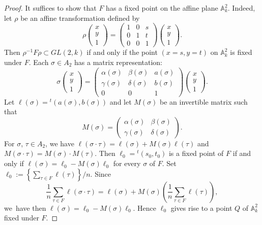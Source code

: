 \begin{proof}
It suffices to show that $F$ has a fixed point on the affine plane
$\mathbb{A}^{2}_{k}$. Indeed, let $\rho$ be an affine transformation
defined by 
$$
\rho
\begin{pmatrix}
x\\
y\\
1
\end{pmatrix}
=
\begin{pmatrix}
1 & 0 & s\\
0 & 1 & t\\
0 & 0 & 1
\end{pmatrix}
\begin{pmatrix}
x\\
y\\
1
\end{pmatrix}.
$$
Then $\rho^{-1}F\rho\subset GL(2,k)$ if and only if the point
$(x=s, y=t)$ on $\mathbb{A}^{2}_{k}$ is fixed under $F$. Each
$\sigma\in A_{2}$ has a matrix representation:
$$
\sigma
\begin{pmatrix}
x\\
y\\
1
\end{pmatrix}
=
\begin{pmatrix}
\alpha(\sigma) & \beta(\sigma) & a(\sigma)\\
\gamma(\sigma) & \delta(\sigma) & b(\sigma)\\
0 & 0 & 1
\end{pmatrix}
\begin{pmatrix}
x\\
y\\
1
\end{pmatrix}.
$$
Let $\ell(\sigma)={}^{t}(a(\sigma),b(\sigma))$ and let $M(\sigma)$ be
an invertible matrix such that
$$
M(\sigma)=
\begin{pmatrix}
\alpha(\sigma) & \beta(\sigma)\\
\gamma(\sigma) & \delta(\sigma)
\end{pmatrix}.
$$
For $\sigma$, $\tau\in A_{2}$, we have $\ell(\sigma\cdot
\tau)=\ell(\sigma)+M(\sigma)\ell(\tau)$ and
$M(\sigma\cdot\tau)=M(\sigma)\cdot M(\tau)$. Then
$\ell_{0}={}^{t}(s_{0},t_{0})$ is a fixed point of $F$ if and only if
$\ell(\sigma)=\ell_{0}-M(\sigma)\ell_{0}$ for every $\sigma$ of
$F$. Set $\ell_{0}:=\left\{{\displaystyle{\mathop{\sum}_{\tau\in
      F}}}\ell(\tau)\right\}/n$. Since
$$
\frac{1}{n}\sum_{\tau\in F}\ell(\sigma\cdot
\tau)=\ell(\sigma)+M(\sigma)\left(\frac{1}{n}\sum_{\tau\in
  F}\ell(\tau)\right),
$$
we\pageoriginale\ have then
$\ell(\sigma)=\ell_{0}-M(\sigma)\ell_{0}$. Hence $\ell_{0}$ gives rise
to a point $Q$ of $\mathbb{A}^{2}_{k}$ fixed under $F$. 
\end{proof}

